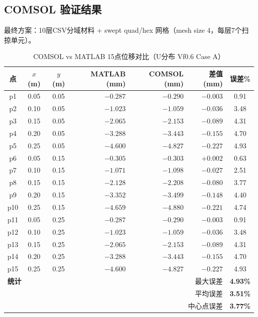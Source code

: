 \documentclass[12pt,a4paper]{ctexart}
\begin{document}
\subsection{COMSOL 验证结果}

最终方案：10层CSV分域材料 + swept quad/hex 网格（mesh size 4，每层7个扫掠单元）。

\begin{table}[H]
\centering
\caption{COMSOL vs MATLAB 15点位移对比（U分布 Vf0.6 Case A）}
\label{tab:15point}
\small
\begin{tabular}{cccrrrc}
\toprule
\textbf{点} & $x$ (m) & $y$ (m) & \textbf{MATLAB} (mm) & \textbf{COMSOL} (mm) & \textbf{差值} (mm) & \textbf{误差\%} \\
\midrule
p1  & 0.05 & 0.05 & $-0.287$ & $-0.290$ & $-0.003$ & 0.91 \\
p2  & 0.10 & 0.05 & $-1.023$ & $-1.059$ & $-0.036$ & 3.48 \\
p3  & 0.15 & 0.05 & $-2.065$ & $-2.153$ & $-0.089$ & 4.31 \\
p4  & 0.20 & 0.05 & $-3.288$ & $-3.443$ & $-0.155$ & 4.70 \\
p5  & 0.25 & 0.05 & $-4.600$ & $-4.827$ & $-0.227$ & 4.93 \\
p6  & 0.05 & 0.15 & $-0.305$ & $-0.303$ & $+0.002$ & 0.63 \\
p7  & 0.10 & 0.15 & $-1.071$ & $-1.098$ & $-0.027$ & 2.51 \\
p8  & 0.15 & 0.15 & $-2.128$ & $-2.208$ & $-0.080$ & 3.77 \\
p9  & 0.20 & 0.15 & $-3.352$ & $-3.499$ & $-0.148$ & 4.40 \\
p10 & 0.25 & 0.15 & $-4.659$ & $-4.880$ & $-0.221$ & 4.74 \\
p11 & 0.05 & 0.25 & $-0.287$ & $-0.290$ & $-0.003$ & 0.91 \\
p12 & 0.10 & 0.25 & $-1.023$ & $-1.059$ & $-0.036$ & 3.48 \\
p13 & 0.15 & 0.25 & $-2.065$ & $-2.153$ & $-0.089$ & 4.31 \\
p14 & 0.20 & 0.25 & $-3.288$ & $-3.443$ & $-0.155$ & 4.70 \\
p15 & 0.25 & 0.25 & $-4.600$ & $-4.827$ & $-0.227$ & 4.93 \\
\midrule
\multicolumn{4}{l}{\textbf{统计}} & \multicolumn{2}{r}{最大误差} & \textbf{4.93\%} \\
\multicolumn{4}{l}{} & \multicolumn{2}{r}{平均误差} & \textbf{3.51\%} \\
\multicolumn{4}{l}{} & \multicolumn{2}{r}{中心点误差} & \textbf{3.77\%} \\
\bottomrule
\end{tabular}
\end{table}
\end{document}
